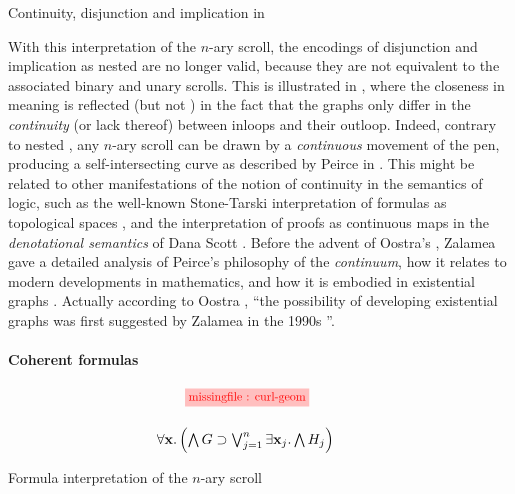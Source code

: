 \begin{scope}
\begin{marginfigure}
  
  \caption{Continuity, disjunction and implication in }
\end{marginfigure}

With this interpretation of the $n$-ary scroll, the  encodings of
disjunction and implication as nested  are no longer valid, because they are
not  equivalent to the associated binary and unary scrolls.
This is illustrated in , where the closeness in meaning is
reflected  (but not ) in the fact that the graphs only
differ in the \emph{continuity} (or lack thereof) between inloops and their
outloop. Indeed, contrary to nested , any $n$-ary scroll can be drawn by a
\emph{continuous} movement of the pen, producing a self-intersecting curve as
described by Peirce in \cite{peirce_prolegomena_1906}. This might be related to
other manifestations of the notion of continuity in the semantics of
 logic, such as the well-known Stone-Tarski interpretation of
formulas as topological spaces \cite{stone_topological_1938}, and the
interpretation of proofs as continuous maps in the \emph{denotational semantics}
of Dana Scott . Before the advent of Oostra's
, Zalamea gave a detailed analysis of Peirce's philosophy of
the \emph{continuum}, how it relates to modern developments in mathematics, and
how it is embodied in existential graphs \cite{zalamea_peirces_2003}. Actually
according to Oostra , ``the
possibility of developing  existential graphs was first suggested
by Zalamea in the 1990s \cite{zalamea_ieg_1,zalamea_ieg_2}''.

\paragraph{Coherent formulas}

\begin{marginfigure}
  $$
  \!\!\!\!
  \!\!\!\!
  \!\!\!\!
  \begin{array}{c}
    \tikzfig{0.85}{0.85}{curl-geom} \vspace{1.5em}\\
    \forall \bx. \left(\bigwedge G \limp \bigvee_{j = 1}^{n}\exists \bx_j. \bigwedge H_j\right)
  \end{array}
  $$
  \caption{Formula interpretation of the $n$-ary scroll}
\end{marginfigure}


\end{scope}
